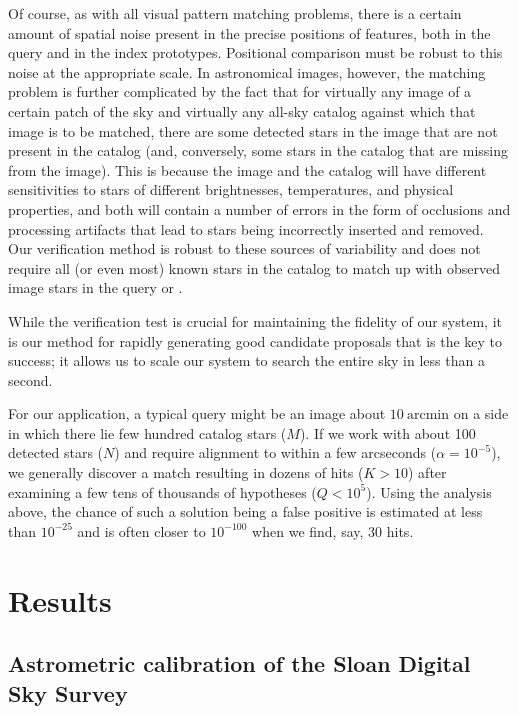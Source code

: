 \documentclass[12pt,preprint]{aastex}
\newcommand{\unit}[1]{\mathrm{#1}}
\renewcommand{\%}{\percent}
\renewcommand{\arcmin}{\unit{arcmin}}
\begin{document}
Of course, as with all visual pattern matching problems, there is a
certain amount of spatial noise present in the precise positions of
features, both in the query and in the index prototypes. Positional
comparison must be robust to this noise at the appropriate scale.  In
astronomical images, however, the matching problem is further
complicated by the fact that for virtually any image of a certain
patch of the sky and virtually any all-sky catalog against which that
image is to be matched, there are some detected stars in the image
that are not present in the catalog (and, conversely, some stars in
the catalog that are missing from the image). This is because the
image and the catalog will have different sensitivities to stars of
different brightnesses, temperatures, and physical properties, and
both will contain a number of errors in the form of occlusions and
processing artifacts that lead to stars being incorrectly inserted and
removed.  Our verification method is robust to these sources of variability
and does not require all (or even most) known stars in the
catalog to match up with observed image stars in the query or
.

While the verification test is crucial for maintaining the fidelity of
our system, it is our method for rapidly generating good candidate
proposals that is the key to success; it allows us to scale our system
to search the entire sky in less than a second.

For our application, a typical query might be an image about
$10~\arcmin$
on a side in which there lie few hundred catalog stars
($M$). If we work with about 100 detected stars ($N$) and require
alignment to within a few arcseconds ($\alpha=10^{-5}$), we generally
discover a match resulting in dozens of hits ($K>10$) after examining
a few tens of thousands of hypotheses ($Q<10^5$). Using the analysis
above, the chance of such a solution being a false positive is
estimated at less than $10^{-25}$ and is often closer to $10^{-100}$
when we find, say, 30 hits.

\section{Results}

\subsection{Astrometric calibration of the Sloan Digital Sky Survey}
\end{document}
